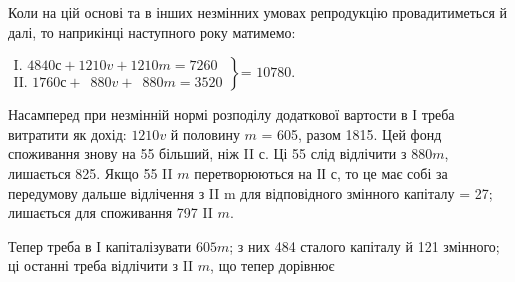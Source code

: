 Коли на цій основі та в інших незмінних умовах репродукцію провадитиметься
й далі, то наприкінці наступного року матимемо:
\begin{center}
$
 \left.\begin{aligned}
        \text{I. }4840 с + 1210 v + 1210 m = 7260\\
        \text{II. }1760 с + \phantom{0}880 v + \phantom{0}880 m = 3520   \end{aligned}
 \right\}
 \text{= 10780.}
$
\end{center}

Насамперед при незмінній нормі розподілу додаткової вартости в І
треба витратити як дохід: $1210 v$ й половину $m$ = 605, разом 1815.
Цей фонд споживання знову на 55 більший, ніж II $с$. Ці 55 слід відлічити
з $880 m$, лишається 825. Якщо 55 II $m$ перетворюються на ІІ $с$, то це
має собі за передумову дальше відлічення з II m для відповідного змінного
капіталу = 27; лишається для споживання 797 II $m$.

Тепер треба в І капіталізувати $605 m$; з них 484 сталого капіталу й
121 змінного; ці останні треба відлічити з II $m$, що тепер дорівнює
\parbreak{}  %
